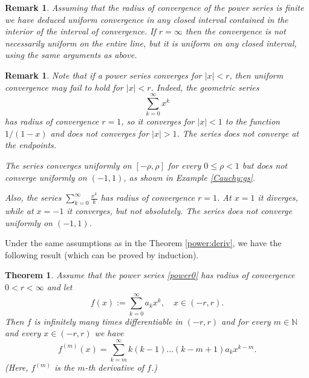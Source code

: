 \documentclass[a4paper,reqno]{amsart}
\numberwithin{equation}{section}
\newtheorem{theorem}[definition]{Theorem}
\newtheorem{remark}[definition]{Remark}
\def\N{\mathbb{N}}
\begin{document}
\begin{remark}
Assuming that the radius of convergence of the power series is finite we have deduced uniform convergence in any closed interval contained in the interior of the interval of convergence. If $r=\infty$ then the convergence is not
necessarily uniform on the entire line, but it is uniform on any closed interval, using the same arguments as above.
\end{remark}

\begin{remark}
Note that if a power series converges for $|x|<r$, then uniform convergence may fail to hold for $|x|<r$. Indeed, the geometric series
$$
\sum_{k=0}^\infty x^k
$$
has radius of convergence $r=1$, so it converges for $|x|<1$ to the function $1/(1-x)$ and does not converges for $|x|>1$. The series does not converge at the endpoints.

The series converges uniformly on $[-\rho, \rho]$ for every $0\leq \rho<1$ but does not converge uniformly on $(-1,1)$, as shown in Example \ref{Cauchy:gs}.

\medskip


Also, the series $\sum_{k=0}^\infty \frac{x^k}{k}$ has radius of convergence $r=1$. At $x=1$ it diverges, while at $x=-1$ it converges, but not absolutely. The series does not converge uniformly on $(-1,1)$.



\end{remark}


Under the same assumptions as in the Theorem \ref{power:deriv}, we have the following result (which can be proved by induction).

\begin{theorem}\label{inf:diff}
Assume that the power series \eqref{power0} has radius of convergence $0<r<\infty$ and let
\begin{equation}\label{sum:pseries}
f(x):= \sum_{k=0}^\infty a_k x^k, \quad x\in (-r,r).
\end{equation}
Then $f$ is infinitely many times differentiable in $(-r,r)$ and for every $m\in \N$ and every $x\in (-r,r)$ we have
\begin{equation}\label{Taylor}
f^{(m)}(x) = \sum_{k=m}^\infty k(k-1)\dots(k-m+1)a_kx^{k-m}.
\end{equation}
(Here, $f^{(m)}$ is the $m$-th derivative of $f$.)
\end{theorem}
\end{document}
